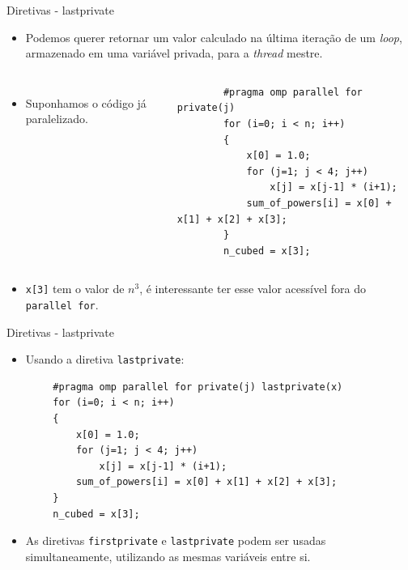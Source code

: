 \begin{frame}[fragile]{Diretivas - lastprivate}
	\begin{itemize}
		\item Podemos querer retornar um valor calculado na última iteração de um \textit{loop}, armazenado em uma variável privada, para a \textit{thread} mestre.
	\end{itemize}
	\begin{columns}
			\begin{itemize}
				\item Suponhamos o código já paralelizado.
			\end{itemize}
		\begin{verbatim}
		#pragma omp parallel for private(j)
		for (i=0; i < n; i++)
		{
			x[0] = 1.0;
			for (j=1; j < 4; j++)
				x[j] = x[j-1] * (i+1);
			sum_of_powers[i] = x[0] + x[1] + x[2] + x[3];
		}
		n_cubed = x[3];
		\end{verbatim}
	\end{columns}
	\begin{itemize}
		\item \texttt{x[3]} tem o valor de $n^3$, é interessante ter esse valor acessível fora do \texttt{parallel for}.
	\end{itemize}
\end{frame}

\begin{frame}[fragile]{Diretivas - lastprivate}
	\begin{itemize}
		\item Usando a diretiva \texttt{lastprivate}:
	\end{itemize}
	\begin{verbatim}
		#pragma omp parallel for private(j) lastprivate(x)
		for (i=0; i < n; i++)
		{
			x[0] = 1.0;
			for (j=1; j < 4; j++)
				x[j] = x[j-1] * (i+1);
			sum_of_powers[i] = x[0] + x[1] + x[2] + x[3];
		}
		n_cubed = x[3];
	\end{verbatim}
	\begin{itemize}
		\item As diretivas \texttt{firstprivate} e \texttt{lastprivate} podem ser usadas simultaneamente, utilizando as mesmas variáveis entre si.
	\end{itemize}
\end{frame}


